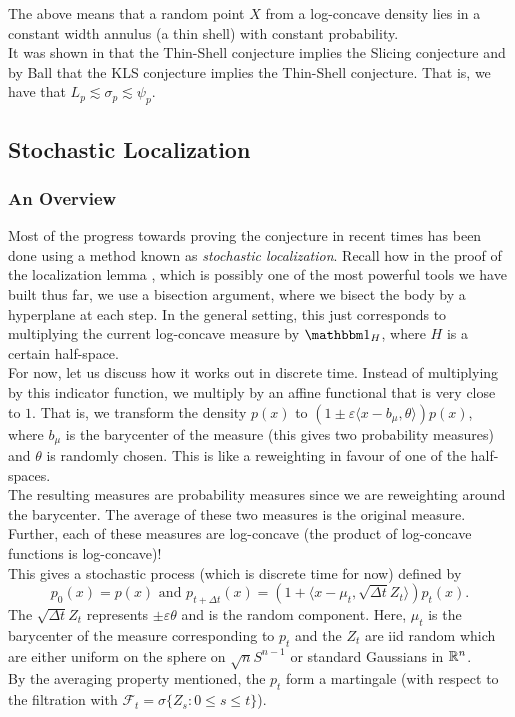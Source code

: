 		The above means that a random point $X$ from a log-concave density lies in a constant width annulus (a thin shell) with constant probability.\\

		It was shown in \cite{Eldan2010ApproximatelyGM} that the Thin-Shell conjecture implies the Slicing conjecture and by Ball that the KLS conjecture implies the Thin-Shell conjecture. That is, we have that $L_p \lesssim \sigma_p \lesssim \psi_p$.

\subsection{Stochastic Localization}

	\subsubsection{An Overview}

		Most of the progress towards proving the conjecture in recent times has been done using a method known as \textit{stochastic localization}. Recall how in the proof of the localization lemma , which is possibly one of the most powerful tools we have built thus far, we use a bisection argument, where we bisect the body by a hyperplane at each step. In the general setting, this just corresponds to multiplying the current log-concave measure by $\indic_{H}$, where $H$ is a certain half-space.\\

		For now, let us discuss how it works out in discrete time. Instead of multiplying by this indicator function, we multiply by an affine functional that is very close to $1$. That is, we transform the density $p(x)$ to $(1\pm\varepsilon\langle x-b_\mu,\theta\rangle)p(x)$, where $b_\mu$ is the barycenter of the measure (this gives two probability measures) and $\theta$ is randomly chosen. This is like a reweighting in favour of one of the half-spaces.\\
		The resulting measures are probability measures since we are reweighting around the barycenter. The average of these two measures is the original measure. Further, each of these measures are log-concave (the product of log-concave functions is log-concave)!\\
		This gives a stochastic process (which is discrete time for now) defined by
		\begin{equation}
			\label{eqn: discrete time stochastic localization}
			p_0(x) = p(x) \text{ and } p_{t+\Delta t}(x) = (1 + \langle x-\mu_t,\sqrt{\Delta t}Z_t\rangle) p_t(x).
		\end{equation}
		The $\sqrt{\Delta t}Z_t$ represents $\pm \varepsilon\theta$ and is the random component. Here, $\mu_t$ is the barycenter of the measure corresponding to $p_t$ and the $Z_t$ are iid random which are either uniform on the sphere on $\sqrt{n}S^{n-1}$ or standard Gaussians in $\mathbb{R}^n$.\\
		By the averaging property mentioned, the $p_t$ form a martingale (with respect to the filtration with $\mathcal{F}_t = \sigma\{Z_s : 0\leq s\leq t\}$).

